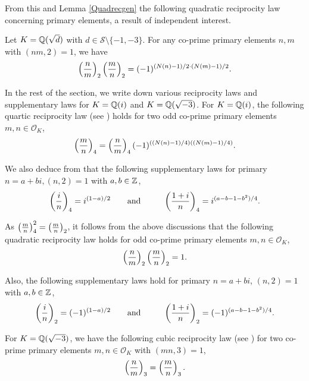 \documentclass[twoside,leqno,10pt, A4]{amsart}
\begin{document}
From this and Lemma \ref{Quadrecgen} the following quadratic reciprocity law concerning primary elements, a result of independent interest.
\begin{lemma} \label{Quadrecgenprim}
   Let $K=\mathbb Q(\sqrt{d})$ with $d \in \mathcal{S} \setminus \{ -1, -3 \}$. For any co-prime primary elements $n,m$ with $(nm, 2)=1$, we have
\begin{align} \label{quadreciKprim}
    \left(\frac{n}{m}\right)_2\left(\frac{m}{n}\right)_2=(-1)^{(N(n)-1)/2\cdot (N(m)-1)/2}.
\end{align}
\end{lemma}

  In the rest of the section, we write down various reciprocity laws and supplementary laws for $K=\mathbb Q(i)$ and $K=\mathbb Q(\sqrt{-3})$.
For $K=\mathbb Q(i)$, the following quartic reciprocity law (see \cite[Theorem 6.9]{Lemmermeyer}) holds for two odd co-prime primary elements $m, n
\in \mathcal{O}_{K}$,
\begin{align*}
 \left(\frac{m}{n}\right)_4 = \left(\frac{n}{m}\right)_4(-1)^{((N(n)-1)/4)((N(m)-1)/4)}.
\end{align*}

  We also deduce from \cite[Theorem 6.9]{Lemmermeyer} that the following supplementary laws for primary $n=a+bi, (n,2)=1$ with $a, b \in \mathbb Z$,
\begin{align*}
  \left(\frac{i}{n}\right)_4=i^{(1-a)/2} \qquad \mbox{and} \qquad  \hspace{0.1in} \left(\frac{1+i}{n}\right)_4=i^{(a-b-1-b^2)/4}.
\end{align*}

    As $\left(\frac{m}{n}\right)^2_4=\left(\frac{m}{n}\right)_2$, it follows from the above discussions that the following quadratic reciprocity law holds for odd co-prime primary elements $m, n \in \mathcal{O}_{K}$,
\begin{align}
\label{quadreciKm1}
    \left(\frac{n}{m}\right)_2\left(\frac{m}{n}\right)_2=1.
\end{align}

   Also, the following supplementary laws hold for primary $n=a+bi$, $(n,2)=1$ with $a, b \in \mathbb Z$,
\begin{align*}
  \left(\frac{i}{n}\right)_2=(-1)^{(1-a)/2} \qquad \mbox{and} \qquad  \hspace{0.1in} \left(\frac{1+i}{n}\right)_2=(-1)^{(a-b-1-b^2)/4}.
\end{align*}

For $K=\mathbb Q(\sqrt{-3})$, we have the following cubic reciprocity law (see \cite[Theorem 7.8]{Lemmermeyer}) for two co-prime primary
elements $m, n \in \mathcal{O}_{K}$ with $(mn, 3)=1$,
\begin{align} \label{cubicrec}
    \left(\frac{n}{m}\right)_3 =\left(\frac{m}{n}\right)_3.
\end{align}
\end{document}
